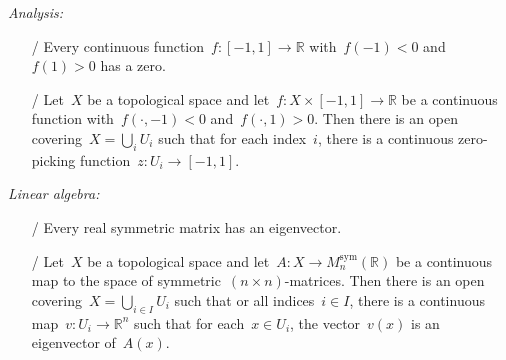 \documentclass[10pt,reqno,a4paper,openany]{amsbook}
\newcommand{\cmark}{\ding{51}}
\newcommand{\xmark}{\ding{55}}
\theoremstyle{definition}
\theoremstyle{plain}
\theoremstyle{remark}
\newcommand{\RR}{\mathbb{R}}
\newcommand{\?}{\,{:}\,}
\renewcommand{\_}{\mathpunct{.}\,}
\begin{document}

\newpage

\emph{Analysis:}
\begin{enumerate}
\item[\cmark/\xmark] Every continuous function~$f : [-1,1] \to \RR$ with~$f(-1) < 0$
  and~$f(1) > 0$ has a zero.
\item[\xmark/\xmark] Let~$X$ be a topological space and let~$f : X \times [-1,1] \to \RR$
be a continuous function with~$f(\cdot,-1) < 0$ and~$f(\cdot,1) > 0$. Then
there is an open covering~$X = \bigcup_i U_i$ such that for each index~$i$,
there is a continuous zero-picking function~$z : U_i \to [-1,1]$.
\end{enumerate}

\emph{Linear algebra:}
\begin{enumerate}
\item[\cmark/\xmark] Every real symmetric matrix has an eigenvector.
\item[\xmark/\xmark] Let~$X$ be a topological space and let~$A : X \to
M^\text{sym}_n(\RR)$ be a continuous map to the space of symmetric~$(n \times
n)$-matrices. Then there is an open covering~$X = \bigcup_{i \in I} U_i$ such
that or all indices~$i \in I$, there is a continuous map~$v : U_i \to \RR^n$
such that for each~$x \in U_i$, the vector~$v(x)$ is an eigenvector of~$A(x)$.
\end{enumerate}
\end{document}
